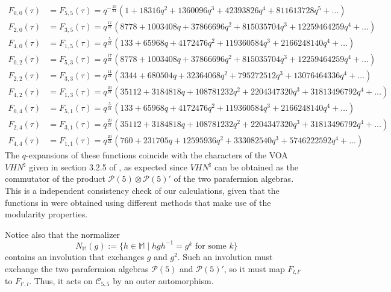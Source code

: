 \documentclass[11pt,reqno]{article}
\newcommand{\be}{\begin{equation}}
\newcommand{\ee}{\end{equation}}
\newcommand{\calC}{\mathcal{C}}
\newcommand{\MM}{\mathbb{M}}
\newcommand{\paraf}{\mathcal{P}}
\begin{document}
\begin{align*}
F_{0,0}(\tau)&=F_{5,5}(\tau)=q^{-\frac{19}{21}}(1+18316 q^2+1360096 q^3+42393826 q^4+811613728 q^5
+\ldots)\\
F_{2,0}(\tau)&=F_{3,5}(\tau)=q^{\frac{17}{21}}(8778+1003408 q+37866696 q^2+815035704 q^3+12259464259 q^4%
+\ldots)\\
F_{4,0}(\tau)&=F_{1,5}(\tau)=q^{\frac{5}{21}}(133+65968 q+4172476 q^2+119360584 q^3+2166248140 q^4%
+\ldots)\\
F_{0,2}(\tau)&=F_{5,3}(\tau)=q^{\frac{17}{21}}(8778+1003408 q+37866696 q^2+815035704 q^3+12259464259 q^4%
+\ldots)\\
F_{2,2}(\tau)&=F_{3,3}(\tau)=q^{\frac{11}{21}}(3344+680504 q+32364068 q^2+795272512 q^3+13076464336 q^4%
+\ldots)\\
F_{4,2}(\tau)&=F_{1,3}(\tau)=q^{\frac{20}{21}}(35112+3184818 q+108781232 q^2+2204347320 q^3+31813496792 q^4%
+\ldots)\\
F_{0,4}(\tau)&=F_{5,1}(\tau)=q^{\frac{5}{21}}(133+65968 q+4172476 q^2+119360584 q^3+2166248140 q^4%
+\ldots)\\
F_{2,4}(\tau)&=F_{3,1}(\tau)=q^{\frac{20}{21}}(35112+3184818 q+108781232 q^2+2204347320 q^3+31813496792 q^4%
+\ldots)\\
F_{4,4}(\tau)&=F_{1,1}(\tau)=q^{\frac{20}{21}}(760+231705 q+12595936 q^2+333082540 q^3+5746222592 q^4%
+\ldots)
\end{align*}
The $q$-expansions of these functions coincide with the characters of the VOA $VHN^\natural$ given in section 3.2.5 of \cite{Bae:2020pvv}, as expected since $VHN^\natural$ can be obtained as the commutator of the product $\paraf(5)\otimes \paraf(5)'$ of the two parafermion algebras. This is a independent consistency check of our calculations, given that the functions in \cite{Bae:2020pvv}were obtained using different methods that make use of the modularity properties.

Notice also that the normalizer
\be N_\MM(g):=\{h\in\MM\mid hgh^{-1}=g^k\text{ for some }k\}
\ee contains an involution that exchanges $g$ and $g^2$. Such an involution must exchange the two parafermion algebras $\paraf(5)$ and $\paraf(5)'$, so it must map $F_{l,l'}$ to $F_{l',l}$. Thus, it acts on $\calC_{5,5}$ by an outer automorphism.
\end{document}
